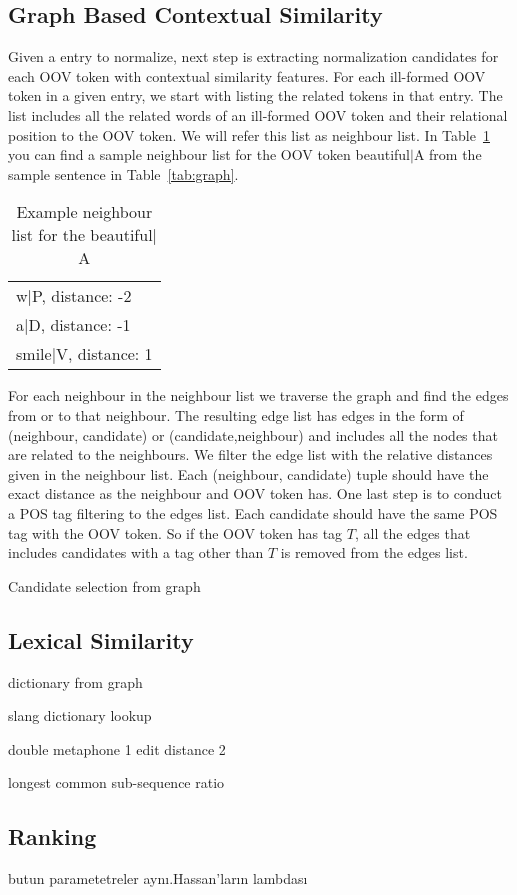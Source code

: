 \subsection{Graph Based Contextual Similarity}

Given a entry to normalize, next step is extracting normalization candidates for each OOV token with contextual similarity features. For each ill-formed OOV token in a given entry, we start with listing the related tokens in that entry. The list includes all the related words of an ill-formed OOV token and their relational position to the OOV token. We will refer this list as neighbour list. In Table~\ref{tab:neigh} you can find a sample neighbour list for the OOV token beautiful$|$A from the sample sentence in Table~\ref{tab:graph}.

\begin{table}[hbt]
  \centering
  \begin{tabular}[tc]{l}
    w$|$P, distance: -2 \\
    a$|$D, distance: -1 \\
    smile$|$V, distance: 1 \\
  \end{tabular}
\caption{Example neighbour list for the beautiful$|$A}
\label{tab:neigh}
\end{table}


For each neighbour in the neighbour list we traverse the graph and find the edges from or to that neighbour. The resulting edge list has edges in the form of (neighbour, candidate) or (candidate,neighbour) and includes all the nodes that are related to the neighbours. We filter the edge list  with the relative distances given in the neighbour list. Each (neighbour, candidate) tuple should have the exact distance as the neighbour and OOV token has. One last step is to conduct a POS tag filtering to the edges list. Each candidate should have the same POS tag with the OOV token. So if the OOV token has tag $T$, all the edges that includes candidates with a tag other than $T$ is removed from the edges list.


Candidate selection from graph

\subsection{Lexical Similarity}

dictionary from graph

slang dictionary lookup

double metaphone 1
edit distance 2


longest common sub-sequence ratio



\subsection{Ranking}

butun parametetreler aynı.Hassan'ların lambdası
